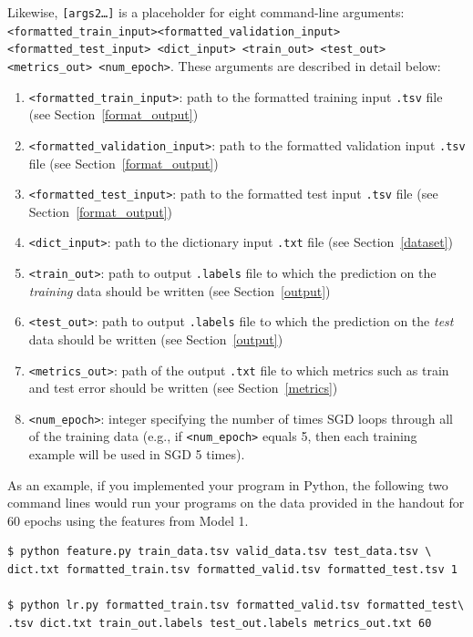\documentclass[11pt,addpoints,answers]{exam}
\begin{document}
Likewise, \texttt{[args2\dots]} is a placeholder for eight command-line arguments: \texttt{<formatted\_train\_input>}\newline \texttt{<formatted\_validation\_input> <formatted\_test\_input> <dict\_input> <train\_out> \newline <test\_out> <metrics\_out> <num\_epoch>}. These arguments are described in detail below:
\begin{enumerate}
    \item \texttt{<formatted\_train\_input>}: path to the formatted training input \texttt{.tsv} file (see Section~\ref{format_output})
    \item \texttt{<formatted\_validation\_input>}: path to the formatted validation input \texttt{.tsv} file (see Section~\ref{format_output})
    \item \texttt{<formatted\_test\_input>}: path to the formatted test input \texttt{.tsv} file (see Section~\ref{format_output})
    \item \texttt{<dict\_input>}: path to the dictionary input \texttt{.txt} file (see Section~\ref{dataset})
    \item \texttt{<train\_out>}: path to output \texttt{.labels} file to which the prediction on the \emph{training} data should be written (see Section~\ref{output})
    \item \texttt{<test\_out>}: path to output \texttt{.labels} file to which the prediction on the \emph{test} data should be written (see Section~\ref{output})
    \item \texttt{<metrics\_out>}: path of the output \texttt{.txt} file to which metrics such as train and test error should be written (see Section~\ref{metrics})
    \item \texttt{<num\_epoch>}: integer specifying the number of times SGD loops through all of the training data (e.g., if \texttt{<num\_epoch>} equals 5, then each training example will be used in SGD 5 times). 
\end{enumerate}

As an example, if you implemented your program in Python, the following two command lines would run your programs on the data provided in the handout for 60 epochs using the features from Model 1.

\begin{lstlisting}[language=Shell]
$ python feature.py train_data.tsv valid_data.tsv test_data.tsv \
dict.txt formatted_train.tsv formatted_valid.tsv formatted_test.tsv 1

$ python lr.py formatted_train.tsv formatted_valid.tsv formatted_test\
.tsv dict.txt train_out.labels test_out.labels metrics_out.txt 60

\end{lstlisting}
\end{document}
